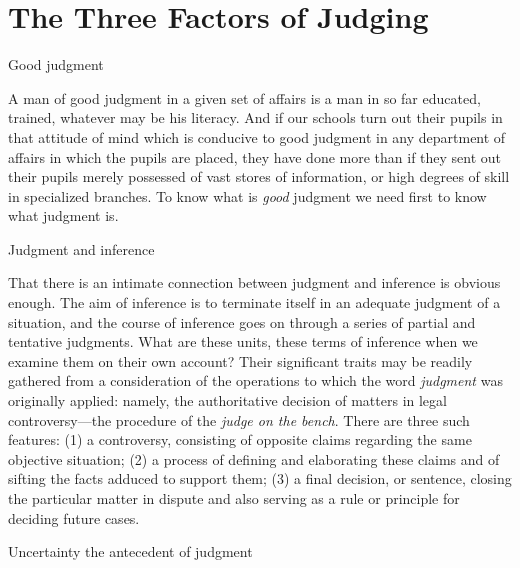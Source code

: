 \documentclass[letterpaper]{book}
\begin{document}
\section{The Three Factors of Judging}

Good judgment

A man of good judgment in a given set of affairs is a man in so far
educated, trained, whatever may be his literacy. And if our schools turn
out their pupils in that attitude of mind which is conducive to good
judgment in any department of affairs in which the pupils are placed,
they have done more than if they sent out their pupils merely possessed
of vast stores of information, or high degrees of skill in specialized
branches. To know what is \emph{good} judgment we need first to know
what judgment is.

Judgment and inference

That there is an intimate connection between judgment and inference is
obvious enough. The aim of inference is to terminate itself in an
adequate judgment of a situation, and the course of inference goes on
through a series of partial and tentative judgments. What are these
units, these terms of inference when we examine them on their own
account? Their significant traits may be readily gathered from a
consideration of the operations to which the word \emph{judgment} was
originally applied: namely, the authoritative decision of matters in
legal controversy---the procedure of the \emph{judge on the bench}.
There are three such features: (1) a controversy, consisting of opposite
claims regarding the same objective situation; (2) a process of defining
and elaborating these claims and of sifting the facts adduced
to
support them; (3) a final decision, or sentence, closing the particular
matter in dispute and also serving as a rule or principle for deciding
future cases.

Uncertainty the antecedent of judgment
\end{document}
